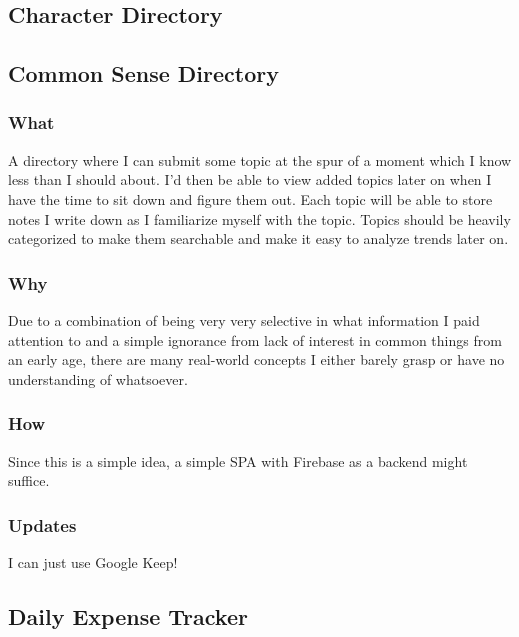\documentclass{article}[2017/07/09]
\begin{document}
  \subsection{Character Directory}

  \subsection{Common Sense Directory}
    \subsubsection{What}
      A directory where I can submit some topic at the spur of a moment which I know less than I should about. I'd then be able to view added topics later on when I have the time to sit down and figure them out.
      Each topic will be able to store notes I write down as I familiarize myself with the topic. Topics should be heavily categorized to make them searchable and make it easy to analyze trends later on.
    \subsubsection{Why}
      Due to a combination of being very very selective in what information I paid attention to and a simple ignorance from lack of interest in common things
      from an early age, there are many real-world concepts I either barely grasp or have no understanding of whatsoever.
    \subsubsection{How}
      Since this is a simple idea, a simple SPA with Firebase as a backend might suffice.
    \subsubsection{Updates}
      I can just use Google Keep!
      
  \subsection{Daily Expense Tracker}
\end{document}
